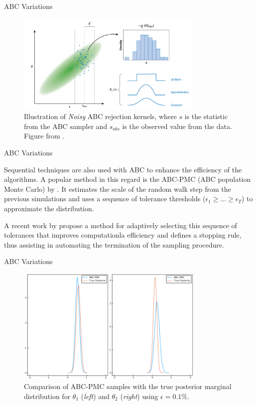 \documentclass[10pt]{beamer}
\begin{document}
\begin{frame}[fragile]{ABC Variations}

    \begin{figure}[H]
        \centering
        \includegraphics[width=9cm]{images/NoisyABC.png}
        \caption{
        Illustration of \textit{Noisy} ABC rejection kernels, where
        $s$ is the statistic from the ABC sampler and $s_{obs}$ is 
        the observed value from the data.
        Figure from \cite{Beaumont2018}.
        }
    \end{figure}

\end{frame}

\begin{frame}[fragile]{ABC Variations}

  Sequential techniques are also used with ABC to enhance the
  efficiency of the algorithms. A popular method in this regard is
  the ABC-PMC (ABC population Monte Carlo) by \citet{Beaumont2009}.
  It estimates the scale of the random walk step from the previous
  simulations and
  uses a sequence of tolerance thresholds
  ($\epsilon_1 \geq ... \geq \epsilon_T$) to approximate the distribution.

   A recent work by \citet{Simola2019} propose a method
   for adaptively selecting this sequence of tolerances that
   improves computationla efficiency and defines a stopping rule,
   thus assisting in automating the termination of the sampling
   procedure.
\end{frame}

\begin{frame}[fragile]{ABC Variations}

    \begin{figure}[H]
        \centering
        \includegraphics[width=9cm]{images/ABC-PMC.png}
        \caption{Comparison of ABC-PMC samples with the true posterior
        marginal distribution for $\theta_1$ (\textit{left}) and
        $\theta_2$ (\textit{right}) using $\epsilon = 0.1\%$.
        }
    \end{figure}

\end{frame}
\AtBeginSection{}
\end{document}
